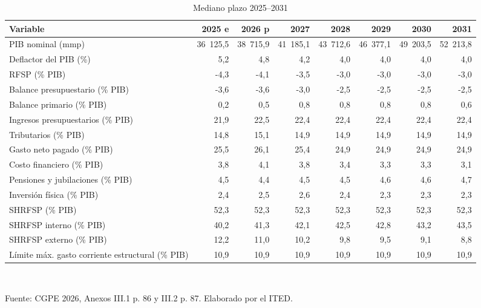 \begin{table}[htbp]
\centering
\scriptsize
\caption{Mediano plazo 2025--2031}
\label{cua:C1_2}
\begin{tabular}{lrrrrrrr}
\toprule
\textbf{Variable} & \textbf{2025 e} & \textbf{2026 p} & \textbf{2027} & \textbf{2028} & \textbf{2029} & \textbf{2030} & \textbf{2031} \\
\midrule
PIB nominal (mmp) & 36 125,5 & 38 715,9 & 41 185,1 & 43 712,6 & 46 377,1 & 49 203,5 & 52 213,8 \\
Deflactor del PIB (\%) & 5,2 & 4,8 & 4,2 & 4,0 & 4,0 & 4,0 & 4,0 \\
RFSP (\% PIB) & -4,3 & -4,1 & -3,5 & -3,0 & -3,0 & -3,0 & -3,0 \\
Balance presupuestario (\% PIB) & -3,6 & -3,6 & -3,0 & -2,5 & -2,5 & -2,5 & -2,5 \\
Balance primario (\% PIB) & 0,2 & 0,5 & 0,8 & 0,8 & 0,8 & 0,8 & 0,6 \\
Ingresos presupuestarios (\% PIB) & 21,9 & 22,5 & 22,4 & 22,4 & 22,4 & 22,4 & 22,4 \\
Tributarios (\% PIB) & 14,8 & 15,1 & 14,9 & 14,9 & 14,9 & 14,9 & 14,9 \\
Gasto neto pagado (\% PIB) & 25,5 & 26,1 & 25,4 & 24,9 & 24,9 & 24,9 & 24,9 \\
Costo financiero (\% PIB) & 3,8 & 4,1 & 3,8 & 3,4 & 3,3 & 3,3 & 3,1 \\
Pensiones y jubilaciones (\% PIB) & 4,5 & 4,4 & 4,5 & 4,5 & 4,6 & 4,6 & 4,7 \\
Inversión física (\% PIB) & 2,4 & 2,5 & 2,6 & 2,4 & 2,3 & 2,3 & 2,3 \\
SHRFSP (\% PIB) & 52,3 & 52,3 & 52,3 & 52,3 & 52,3 & 52,3 & 52,3 \\
SHRFSP interno (\% PIB) & 40,2 & 41,3 & 42,1 & 42,5 & 42,8 & 43,2 & 43,5 \\
SHRFSP externo (\% PIB) & 12,2 & 11,0 & 10,2 & 9,8 & 9,5 & 9,1 & 8,8 \\
Límite máx. gasto corriente estructural (\% PIB) & 10,9 & 10,9 & 10,9 & 10,9 & 10,9 & 10,9 & 10,9 \\
\bottomrule
\end{tabular}
\\[2pt]\begin{minipage}{0.92\textwidth}\scriptsize Fuente: CGPE 2026, Anexos III.1 p. 86 y III.2 p. 87. Elaborado por el ITED.\end{minipage}
\end{table}
